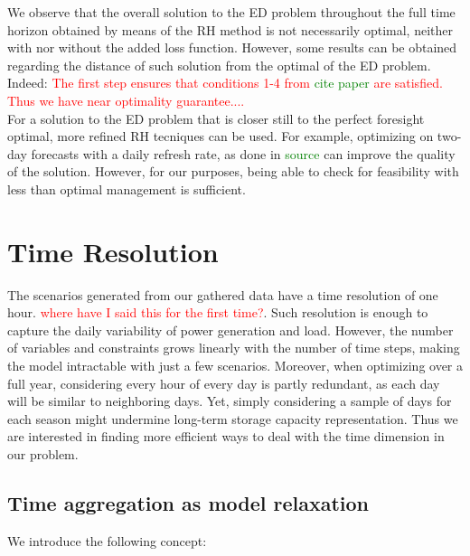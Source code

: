 We observe that the overall solution to the ED problem throughout the full time horizon obtained by means of the RH method is not necessarily optimal, neither with nor without the added loss function. However, some results can be obtained regarding the distance of such solution from the optimal of the ED problem. Indeed:
\textcolor{red}{The first step ensures that conditions 1-4 from \textcolor{green}{cite paper} are satisfied. Thus we have near optimality guarantee....}\\
For a solution to the ED problem that is closer still to the perfect foresight optimal, more refined RH tecniques can be used. For example, optimizing on two-day forecasts with a daily refresh rate, as done in \textcolor{green}{source} can improve the quality of the solution. However, for our purposes, being able to check for feasibility with less than optimal management is sufficient.







\section{Time Resolution}\label{section:time-resolution}


The scenarios generated from our gathered data have a time resolution of one hour. \textcolor{red}{where have I said this for the first time?}. Such resolution is enough to capture the daily variability of power generation and load. However, the number of variables and constraints grows linearly with the number of time steps, making the model intractable with just a few scenarios.
Moreover, when optimizing over a full year, considering every hour of every day is partly redundant, as each day will be similar to neighboring days. Yet, simply considering a sample of days for each season might undermine long-term storage capacity representation. Thus we are interested in finding more efficient ways to deal with the time dimension in our problem. \\

\subsection{Time aggregation as model relaxation}
We introduce the following concept:

